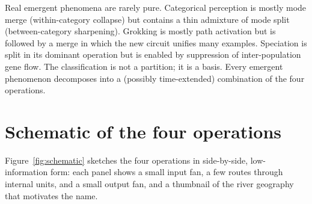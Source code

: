 \documentclass[11pt,a4paper]{article}
\begin{document}
Real emergent phenomena are rarely pure. Categorical perception
is mostly mode merge (within-category collapse) but contains a
thin admixture of mode split (between-category sharpening).
Grokking is mostly path activation but is followed by a merge in
which the new circuit unifies many examples. Speciation is split
in its dominant operation but is enabled by suppression of
inter-population gene flow. The classification is not a
partition; it is a basis. Every emergent phenomenon decomposes
into a (possibly time-extended) combination of the four
operations.

\section{Schematic of the four operations}

Figure~\ref{fig:schematic} sketches the four operations in
side-by-side, low-information form: each panel shows a small input
fan, a few routes through internal units, and a small output fan,
and a thumbnail of the river geography that motivates the name.
\end{document}
